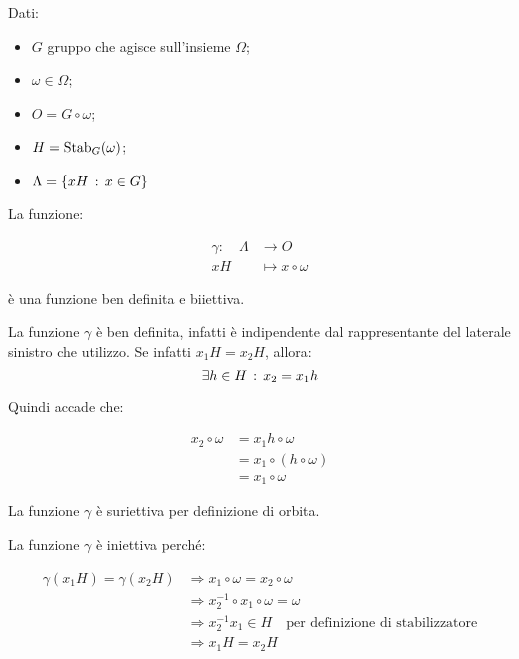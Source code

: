 \begin{teorema}
	\label{thr:orbite}
	Dati:
	
	\begin{itemize}
		\item $G$ gruppo che agisce sull'insieme $\Omega$;
		\item $\omega \in \Omega$;
		\item $O = G \circ \omega$;
		\item $H = \operatorname{Stab}_G(\omega)$;
		\item $\Lambda = \{xH \,:\, x \in G\}$
	\end{itemize}

	La funzione:
	
	\begin{align}
		\gamma :\quad \Lambda &\longrightarrow O \\
		xH &\longmapsto x \circ \omega
	\end{align}

	è una funzione ben definita e biiettiva.
\end{teorema}
\begin{dimostrazione}
	La funzione $\gamma$ è ben definita, infatti è indipendente dal rappresentante del laterale sinistro che utilizzo. Se infatti $x_1H = x_2H$, allora:
	\begin{equation*}
		\exists h \in H \,:\, x_2 = x_1 h
	\end{equation*}
	
	Quindi accade che:
	
	\begin{align}
		x_2 \circ \omega &= x_1 h \circ \omega \\
		&= x_1 \circ (h \circ \omega) \\
		&= x_1 \circ \omega
	\end{align}

	La funzione $\gamma$ è suriettiva per definizione di orbita. 
	
	La funzione $\gamma$ è iniettiva perché:
	
	\begin{align}
		\gamma(x_1H) = \gamma(x_2H) 
		&\Longrightarrow x_1 \circ \omega = x_2 \circ \omega \\
		&\Longrightarrow x_2^{-1} \circ x_1 \circ \omega = \omega \\
		&\Longrightarrow x_2^{-1} x_1 \in H \quad \text{per definizione di stabilizzatore} \\
		&\Longrightarrow x_1H = x_2H
	\end{align}
\end{dimostrazione}

